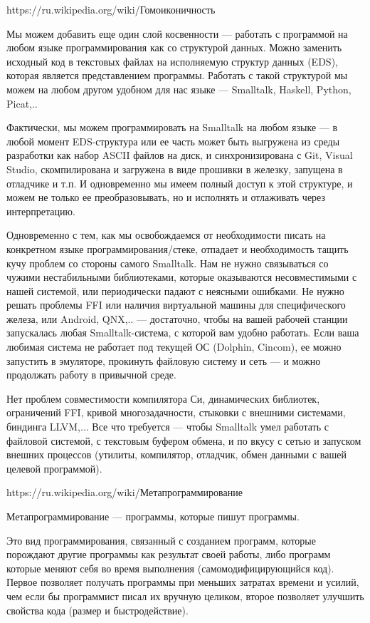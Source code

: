 https://ru.wikipedia.org/wiki/Гомоиконичность

Мы можем добавить еще один слой косвенности — работать с программой на любом языке программирования как со структурой данных. Можно заменить исходный код в текстовых файлах на исполняемую структур данных (EDS), которая является представлением программы. Работать с такой структурой мы можем на любом другом удобном для нас языке — Smalltalk, Haskell, Python, Picat,..

Фактически, мы можем программировать на Smalltalk на любом языке — в любой момент EDS-структура или ее часть может быть выгружена из среды разработки как набор ASCII файлов на диск, и синхронизирована с Git, Visual Studio, скомпилирована и загружена в виде прошивки в железку, запущена в отладчике и т.п. И одновременно мы имеем полный доступ к этой структуре, и можем не только ее преобразовывать, но и исполнять и отлаживать через интерпретацию.

\clearpage

Одновременно с тем, как мы освобождаемся от необходимости писать на конкретном языке программирования/стеке, отпадает и необходимость тащить кучу проблем со стороны самого Smalltalk. Нам не нужно связываться со чужими нестабильными библиотеками, которые оказываются несовместимыми с нашей системой, или периодически падают с неясными ошибками. Не нужно решать проблемы FFI или наличия виртуальной машины для специфического железа, или Android, QNX,.. — достаточно, чтобы на вашей рабочей станции запускалась любая Smalltalk-система, с которой вам удобно работать. Если ваша любимая система не работает под текущей ОС (Dolphin, Cincom), ее можно запустить в эмуляторе, прокинуть файловую систему и сеть — и можно продолжать работу в привычной среде.

Нет проблем совместимости компилятора Си, динамических библиотек, ограничений FFI, кривой многозадачности, стыковки с внешними системами, биндинга LLVM,... Все что требуется — чтобы Smalltalk умел работать с файловой системой, с текстовым буфером обмена, и по вкусу с сетью и запуском внешних процессов (утилиты, компилятор, отладчик, обмен данными с вашей целевой программой).

\clearpage

https://ru.wikipedia.org/wiki/Метапрограммирование

Метапрограммирование — программы, которые пишут программы.

Это вид программирования, связанный с созданием программ, которые порождают другие программы как результат своей работы, либо программ которые меняют себя во время выполнения (самомодифицирующийся код). Первое позволяет получать программы при меньших затратах времени и усилий, чем если бы программист писал их вручную целиком, второе позволяет улучшить свойства кода (размер и быстродействие).

